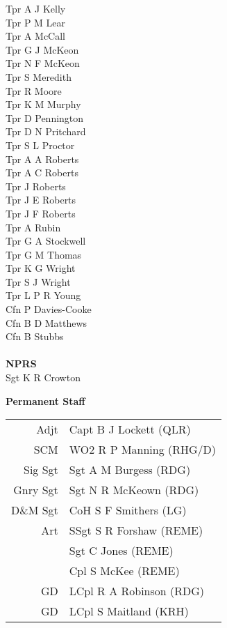 \begin{multicols}{2}
  Tpr A J Kelly \\
  Tpr P M Lear \\
  Tpr A McCall \\
  Tpr G J McKeon \\
  Tpr N F McKeon \\
  Tpr S Meredith \\
  Tpr R Moore \\
  Tpr K M Murphy \\
  Tpr D Pennington \\
  Tpr D N Pritchard \\
  Tpr S L Proctor \\
  Tpr A A Roberts \\
  Tpr A C Roberts \\
  Tpr J Roberts \\
  Tpr J E Roberts \\
  Tpr J F Roberts \\
  Tpr A Rubin \\
  Tpr G A Stockwell \\
  Tpr G M Thomas \\
  Tpr K G Wright \\
  Tpr S J Wright \\
  Tpr L P R Young \\
  Cfn P Davies-Cooke \\
  Cfn B D Matthews \\
  Cfn B Stubbs \\
  \\
  \textbf{NPRS} \\
  Sgt K R Crowton \\
\end{multicols}

\begin{center}
  \Large
  \textbf{Permanent Staff}
\end{center}

\begin{center}
  \begin{tabular}{rl}
    Adjt & Capt B J Lockett (QLR) \\
    SCM & WO2 R P Manning (RHG/D) \\
    Sig Sgt & Sgt A M Burgess (RDG) \\
    Gnry Sgt & Sgt N R McKeown (RDG) \\
    D\&M Sgt & CoH S F Smithers (LG) \\
    Art & SSgt S R Forshaw (REME) \\
    & Sgt C Jones (REME) \\
    & Cpl S McKee (REME) \\
    GD & LCpl R A Robinson (RDG) \\
    GD & LCpl S Maitland (KRH) \\
  \end{tabular}
\end{center}
